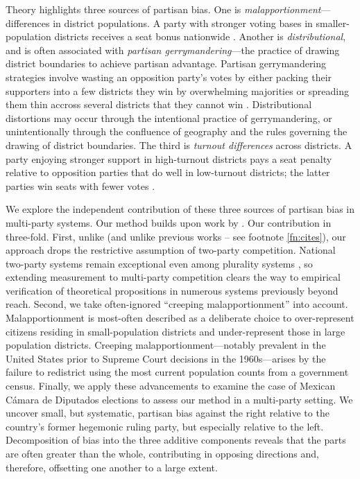 \documentclass[letter,12pt]{article}
\begin{document}
Theory highlights three sources of partisan bias. One is \emph{malapportionment}---differences in district populations. A party with stronger voting bases in smaller-population districts receives a seat bonus nationwide \citep{johnston.2002,jackmanMeasuringBias1994}. Another is \emph{distributional}, and is often associated with \emph{partisan gerrymandering}---the practice of drawing district boundaries to achieve partisan advantage. Partisan gerrymandering strategies involve wasting an opposition party's votes by either packing their supporters into a few districts they win by overwhelming majorities or spreading them thin accross several districts that they cannot win \citep{owen.grofman.1988.partisangerrymandering,cox.katz.2002,engstrom2006redisttrictApsr}. Distributional distortions may occur through the intentional practice of gerrymandering, or unintentionally through the confluence of geography and the rules governing the drawing of district boundaries. The third is \emph{turnout differences} across districts. A party enjoying stronger support in high-turnout districts pays a seat penalty relative to opposition parties that do well in low-turnout districts; the latter parties win seats with fewer votes \citep{campbellTurnoutBias1996,rosenstone.hansen.1993}.  

We explore the independent contribution of these three sources of partisan bias in multi-party systems. Our method builds upon work by \citet{grofman.etalBiasMalapp.1997}. Our contribution in three-fold. First, unlike \citeauthor{grofman.etalBiasMalapp.1997} (and unlike previous works -- see footnote \ref{fn:cites}), our approach drops the restrictive assumption of two-party competition. National two-party systems remain exceptional even among plurality systems \citep{cox.1997}, so extending measurement to multi-party competition clears the way to empirical verification of theoretical propositions in numerous systems previously beyond reach. Second, we take often-ignored ``creeping malapportionment'' \citep{johnston.2002} into account. Malapportionment is most-often described as a deliberate choice to over-represent citizens residing in small-population districts and under-represent those in large population districts. Creeping malapportionment---notably prevalent in the United States prior to Supreme Court decisions in the 1960s---arises by the failure to redistrict using the most current population counts from a government census. Finally, we apply these advancements to examine the case of Mexican C\'amara de Diputados elections to assess our method in a multi-party setting. We uncover small, but systematic, partisan bias against the right relative to the country's former hegemonic ruling party, but especially relative to the left. Decomposition of bias into the three additive components reveals that the parts are often greater than the whole, contributing in opposing directions and, therefore, offsetting one another to a large extent. 
\end{document}
